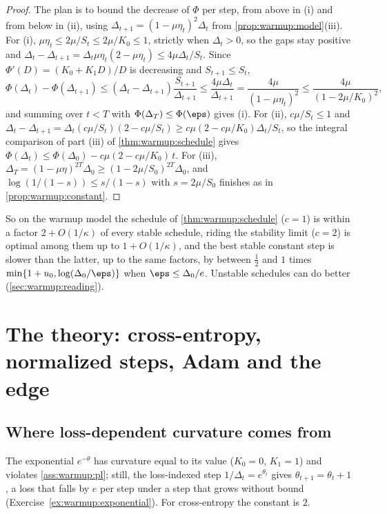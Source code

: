 \begin{refsection}
\begin{proof}
The plan is to bound the decrease of $\Phi$ per step, from above in (i) and from below in (ii), using $\Delta_{t+1}=(1-\mu\eta_t)^2\Delta_t$ from \cref{prop:warmup:model}(iii). For (i), $\mu\eta_t\le2\mu/S_t\le2\mu/K_0\le1$, strictly when $\Delta_t>0$, so the gaps stay positive and $\Delta_t-\Delta_{t+1}=\Delta_t\mu\eta_t(2-\mu\eta_t)\le4\mu\Delta_t/S_t$. Since $\Phi'(D)=(K_0+K_1D)/D$ is decreasing and $S_{t+1}\le S_t$,
\[
  \Phi(\Delta_t)-\Phi(\Delta_{t+1})\le(\Delta_t-\Delta_{t+1})\frac{S_{t+1}}{\Delta_{t+1}}\le\frac{4\mu\Delta_t}{\Delta_{t+1}}=\frac{4\mu}{(1-\mu\eta_t)^2}\le\frac{4\mu}{(1-2\mu/K_0)^2},
\]
and summing over $t<T$ with $\Phi(\Delta_T)\le\Phi(\eps)$ gives (i). For (ii), $c\mu/S_t\le1$ and $\Delta_t-\Delta_{t+1}=\Delta_t(c\mu/S_t)(2-c\mu/S_t)\ge c\mu(2-c\mu/K_0)\Delta_t/S_t$, so the integral comparison of part (iii) of \cref{thm:warmup:schedule} gives $\Phi(\Delta_t)\le\Phi(\Delta_0)-c\mu(2-c\mu/K_0)\,t$. For (iii), $\Delta_T=(1-\mu\eta)^{2T}\Delta_0\ge(1-2\mu/S_0)^{2T}\Delta_0$, and $\log(1/(1-s))\le s/(1-s)$ with $s=2\mu/S_0$ finishes as in \cref{prop:warmup:constant}.
\end{proof}

So on the warmup model the schedule of \cref{thm:warmup:schedule} ($c=1$) is within a factor $2+O(1/\kappa)$ of every stable schedule, riding the stability limit ($c=2$) is optimal among them up to $1+O(1/\kappa)$, and the best stable constant step is slower than the latter, up to the same factors, by between $\frac12$ and $1$ times $\min\{1+u_0,\log(\Delta_0/\eps)\}$ when $\eps\le\Delta_0/e$. Unstable schedules can do better (\cref{sec:warmup:reading}).

\section{The theory: cross-entropy, normalized steps, Adam and the edge}\label{sec:warmup:more}

\subsection{Where loss-dependent curvature comes from}\label{sec:warmup:ce}

The exponential $e^{-\theta}$ has curvature equal to its value ($K_0=0$, $K_1=1$) and violates \cref{ass:warmup:pl}; still, the loss-indexed step $1/\Delta_t=e^{\theta_t}$ gives $\theta_{t+1}=\theta_t+1$, a loss that falls by $e$ per step under a step that grows without bound (Exercise~\ref{ex:warmup:exponential}). For cross-entropy the constant is $2$.


\end{refsection}
